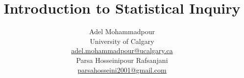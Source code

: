 


\title{Introduction to Statistical Inquiry \vspace*{18pt}}
\author{Adel Mohammadpour \\ University of Calgary \\ \url{adel.mohammadpour@ucalgary.ca} \vspace*{18pt} \\
Parsa Hosseinipour Rafsanjani \\ \url{parsahosseini2001@gmail.com} \vspace*{36pt}}


 
